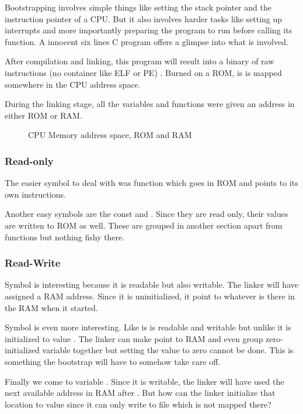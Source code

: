 Bootstrapping involves simple things like setting the stack pointer and the instruction pointer of a CPU. But it also involves harder tasks like setting up interrupts and more importantly preparing the program to run before calling its  function. A innocent six lines C program offers a glimpse into what is involved.



After compilation and linking, this program will result into a binary of raw instructions (no container like ELF or PE) . Burned on a ROM, is is mapped somewhere in the CPU address space.

During the linking stage, all the variables and functions were given an address in either ROM or RAM. 

\begin{figure}[H]
\caption*{CPU Memory address space, ROM and RAM}
\end{figure}

\subsubsection{Read-only}
The easier symbol to deal with was function  which goes in ROM and points to its own instructions.

Another easy symbols are the const  and . Since they are read only, their values are written to ROM as well. These are grouped in another section  apart from functions but nothing fishy there.

\subsubsection{Read-Write}
Symbol  is interesting because it is readable but also writable. The linker will have assigned a RAM address. Since it is uninitialized, it point to whatever is there in the RAM when it started.

Symbol  is even more interesting. Like  is is readable and writable but unlike  it is initialized  to value . The linker can make  point to RAM and even group zero-initialized variable together but setting the value to zero cannot be done. This is something the bootstrap will have to somehow take care off.

Finally we come to variable . Since it is writable, the linker will have used the next available address in RAM after . But how can the linker initialize that location to value  since it can only write to file  which is not mapped there? 

